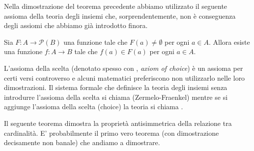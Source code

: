 Nella dimostrazione del teorema precedente abbiamo utilizzato il seguente assioma 
della teoria degli insiemi che, sorprendentemente, non è conseguenza degli assiomi 
che abbiamo già introdotto finora.

\begin{axiom}%
  \label{axiom:AC}%
  Sia $F\colon A \to \mathcal P(B)$
  una funzione tale che $F(a)\neq \emptyset$ 
  per ogni $a\in A$. Allora esiste una funzione
  $f\colon A \to B$ tale che $f(a)\in F(a)$
  per ogni $a\in A$.
\end{axiom}

L'assioma della scelta (denotato spesso con , \emph{axiom of choice})
è un assioma per certi versi controverso
e alcuni matematici preferiscono non utilizzarlo nelle loro dimostrazioni.
Il sistema formale che definisce la teoria degli insiemi senza 
introdurre l'assioma della scelta 
si chiama  (Zermelo-Fraenkel) mentre 
se si aggiunge l'assioma della scelta (choice) la teoria si chiama 
.

Il seguente teorema dimostra la proprietà antisimmetrica 
della relazione tra cardinalità. 
E' probabilmente il primo vero teorema (con dimostrazione decisamente non banale) 
che andiamo a dimostrare.


